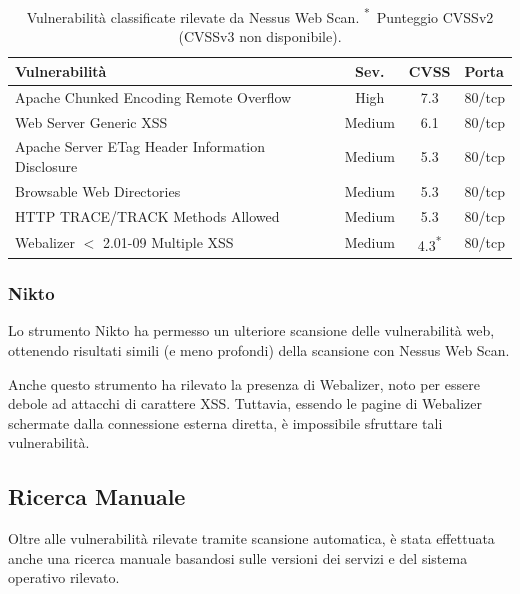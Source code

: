 \documentclass[12pt, a4paper]{article}
\begin{document}
	\begin{table}[htbp]
		\centering
		\small
		\begin{tabular}{|p{6.5cm}|c|c|p{1.8cm}|}
			\hline
			\textbf{Vulnerabilità} & \textbf{Sev.} & \textbf{CVSS} & \textbf{Porta} \\
			\hline
			Apache Chunked Encoding Remote Overflow
			& High & 7.3 & 80/tcp \\
			\hline
			Web Server Generic XSS & Medium & 6.1 & 80/tcp \\
			\hline
			Apache Server ETag Header Information Disclosure
			& Medium & 5.3 & 80/tcp \\
			\hline
			Browsable Web Directories & Medium & 5.3 & 80/tcp \\
			\hline
			HTTP TRACE/TRACK Methods Allowed
			& Medium & 5.3 & 80/tcp \\
			\hline
			Webalizer $<$ 2.01-09 Multiple XSS
			& Medium & 4.3\textsuperscript{*} & 80/tcp \\
			\hline
		\end{tabular}
		\caption{Vulnerabilità classificate rilevate da Nessus Web Scan.
			\textsuperscript{*}~Punteggio CVSSv2 (CVSSv3 non disponibile).}
	\end{table}
	
	\newpage
	\subsubsection{Nikto}
	Lo strumento Nikto\cite{nikto} ha permesso un ulteriore scansione delle vulnerabilità web, ottenendo risultati simili (e meno profondi) della scansione con Nessus Web Scan.
	
	
	Anche questo strumento ha rilevato la presenza di Webalizer, noto per essere debole ad attacchi di carattere XSS. Tuttavia, essendo le pagine di Webalizer schermate dalla connessione esterna diretta, è impossibile sfruttare tali vulnerabilità.
	
	\subsection{Ricerca Manuale}
	Oltre alle vulnerabilità rilevate tramite scansione automatica, è stata effettuata anche una ricerca manuale basandosi sulle versioni dei servizi e del sistema operativo rilevato.
	
\end{document}
